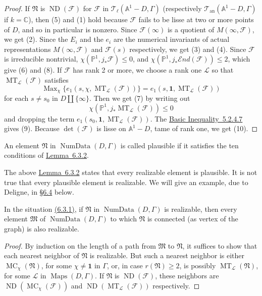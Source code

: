 \begin{proof}
If \(\mathfrak{N}\) is \(\operatorname{ND}(\mathcal{F})\) for \(\mathcal{F}\) in \(\mathcal{T}_\ell(\mathbb{A}^1-D,\Gamma)\) (respectively \(\mathcal{T}_{\mathrm{an}}(\mathbb{A}^1-D,\Gamma)\) if \(k=\mathbb{C}\)), then (5) and (1) hold because \(\mathcal{F}\) fails to be lisse at two or more points of \(D\), and so in particular is nonzero. Since \(\mathcal{F}(\infty)\) is a quotient of \(M(\infty,\mathcal{F})\), we get (2). Since the \(E_i\) and the \(e_i\) are the numerical invariants of actual representations \(M(\infty,\mathcal{F})\) and \(\mathcal{F}(s)\) respectively, we get (3) and (4). Since \(\mathcal{F}\) is irreducible nontrivial, \(\chi(\mathbb{P}^1,j_*\mathcal{F})\leq 0\), and \(\chi(\mathbb{P}^1,j_*\mathcal{E}nd(\mathcal{F}))\leq 2\), which give (6) and (8). If \(\mathcal{F}\) has rank 2 or more, we choose a rank one \(\mathcal{L}\) so that \(\operatorname{MT}_{\mathcal{L}}(\mathcal{F})\) satisfies
\[
\operatorname{Max}_{\chi}\{e_1(s,\chi,\operatorname{MT}_{\mathcal{L}}(\mathcal{F}))\}=e_1(s,\mathbf{1},\operatorname{MT}_{\mathcal{L}}(\mathcal{F}))
\]
for each \(s\ne s_0\) in \(D\amalg\{\infty\}\). Then we get (7) by writing out
\[
\chi(\mathbb{P}^1,j_*\operatorname{MT}_{\mathcal{L}}(\mathcal{F}))\leq 0
\]
and dropping the term \(e_1(s_0,\mathbf{1},\operatorname{MT}_{\mathcal{L}}(\mathcal{F}))\). The \hyperref[ineq:5.2.4.7]{Basic Inequality~5.2.4.7} gives (9). Because \(\det(\mathcal{F})\) is lisse on \(\mathbb{A}^1-D\), tame of rank one, we get (10).
\end{proof}

An element \(\mathfrak{N}\) in \(\operatorname{NumData}(D,\Gamma)\) is called plausible if it satisfies the ten conditions of \hyperref[lem:6.3.2]{Lemma~6.3.2}.

The above \hyperref[lem:6.3.2]{Lemma~6.3.2} states that every realizable element is plausible. It is not true that every plausible element is realizable. We will give an example, due to Deligne, in \hyperref[sec:6.4]{\S6.4} below.

In the situation \hyperref[par:6.3.1]{(6.3.1)}, if \(\mathfrak{N}\) in \(\operatorname{NumData}(D,\Gamma)\) is realizable, then every element \(\mathfrak{M}\) of \(\operatorname{NumData}(D,\Gamma)\) to which \(\mathfrak{N}\) is connected (as vertex of the graph) is also realizable.
\begin{proof}
By induction on the length of a path from \(\mathfrak{M}\) to \(\mathfrak{N}\), it suffices to show that each nearest neighbor of \(\mathfrak{N}\) is realizable. But such a nearest neighbor is either \(\operatorname{MC}_\chi(\mathfrak{N})\), for some \(\chi\ne\mathbf{1}\) in \(\Gamma\), or, in case \(r(\mathfrak{N})\geq 2\), is possibly \(\operatorname{MT}_{\mathcal{L}}(\mathfrak{N})\), for some \(\mathcal{L}\) in \(\operatorname{Maps}(D,\Gamma)\). If \(\mathfrak{N}\) is \(\operatorname{ND}(\mathcal{F})\), these neighbors are \(\operatorname{ND}(\operatorname{MC}_\chi(\mathcal{F}))\) and \(\operatorname{ND}(\operatorname{MT}_{\mathcal{L}}(\mathcal{F}))\) respectively.
\end{proof}

